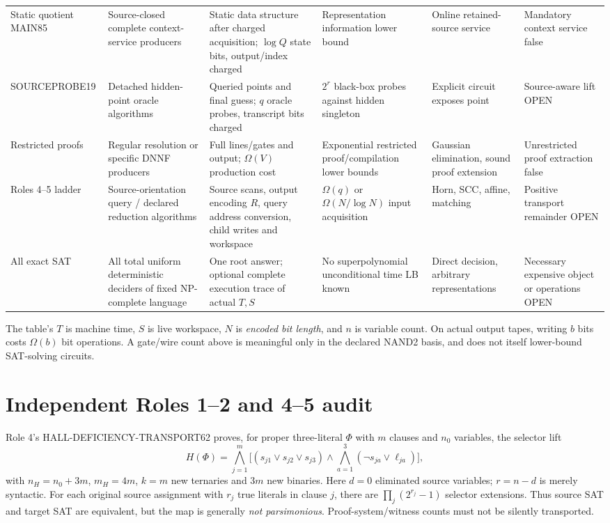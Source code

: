 \documentclass[11pt]{article}
\begin{document}
\begin{longtable}{@{}p{.13\linewidth}p{.13\linewidth}p{.23\linewidth}p{.18\linewidth}p{.16\linewidth}p{.13\linewidth}@{}}
Static quotient MAIN85 & Source-closed complete context-service producers & Static data structure after charged acquisition; $\log Q$ state bits, output/index charged & Representation information lower bound & Online retained-source service & Mandatory context service false\\
SOURCEPROBE19 & Detached hidden-point oracle algorithms & Queried points and final guess; $q$ oracle probes, transcript bits charged & $2^r$ black-box probes against hidden singleton & Explicit circuit exposes point & Source-aware lift OPEN\\
Restricted proofs & Regular resolution or specific DNNF producers & Full lines/gates and output; $\Omega(V)$ production cost & Exponential restricted proof/compilation lower bounds & Gaussian elimination, sound proof extension & Unrestricted proof extraction false\\
Roles 4--5 ladder & Source-orientation query / declared reduction algorithms & Source scans, output encoding $R$, query address conversion, child writes and workspace & $\Omega(q)$ or $\Omega(N/\log N)$ input acquisition & Horn, SCC, affine, matching & Positive transport remainder OPEN\\
All exact SAT & All total uniform deterministic deciders of fixed NP-complete language & One root answer; optional complete execution trace of actual $T,S$ & No superpolynomial unconditional time LB known & Direct decision, arbitrary representations & Necessary expensive object or operations OPEN\\
\bottomrule
\end{longtable}
\normalsize
The table's $T$ is machine time, $S$ is live workspace, $N$ is \emph{encoded bit length}, and $n$ is variable count. On actual output tapes, writing $b$ bits costs $\Omega(b)$ bit operations. A gate/wire count above is meaningful only in the declared NAND2 basis, and does not itself lower-bound SAT-solving circuits.

\section{Independent Roles 1--2 and 4--5 audit}
Role 4's HALL-DEFICIENCY-TRANSPORT62 proves, for proper three-literal $\Phi$ with $m$ clauses and $n_0$ variables, the selector lift
\[
H(\Phi)=\bigwedge_{j=1}^m
\bigl[(s_{j1}\vee s_{j2}\vee s_{j3})\wedge
\bigwedge_{a=1}^3(\neg s_{ja}\vee \ell_{ja})\bigr],
\]
with $n_H=n_0+3m$, $m_H=4m$, $k=m$ new ternaries and $3m$ new binaries. Here $d=0$ eliminated source variables; $r=n-d$ is merely syntactic. For each original source assignment with $r_j$ true literals in clause $j$, there are $\prod_j(2^{r_j}-1)$ selector extensions. Thus source SAT and target SAT are equivalent, but the map is generally \emph{not parsimonious}. Proof-system/witness counts must not be silently transported.
\end{document}
